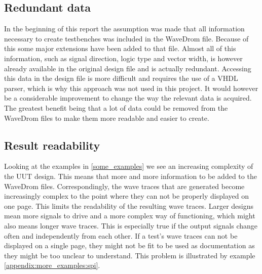 \subsection{Redundant data}
In the beginning of this report the assumption was made that all information necessary to create testbenches was included in the WaveDrom file. Because of this some major extensions have been added to that file. Almost all of this information, such as signal direction, logic type and vector width, is however already available in the original design file and is actually redundant. Accessing this data in the design file is more difficult and requires the use of a VHDL parser, which is why this approach was not used in this project.
\npar
It would however be a considerable improvement to change the way the relevant data is acquired. The greatest benefit being that a lot of data could be removed from the WaveDrom files to make them more readable and easier to create.
\subsection{Result readability}
Looking at the examples in \ref{some_examples} we see an increasing complexity of the UUT design. This means that more and more information to be added to the WaveDrom files. Correspondingly, the wave traces that are generated become increasingly complex to the point where they can not be properly displayed on one page. This limits the readability of the resulting wave traces. 
\npar
Larger designs mean more signals to drive and a more complex way of functioning, which might also means longer wave traces. This is especially true if the output signals change often and independently from each other.
\npar
If a test's wave traces can not be displayed on a single page, they might not be fit to be used as documentation as they might be too unclear to understand. This problem is illustrated by example \ref{appendix:more_examples:spi}.
